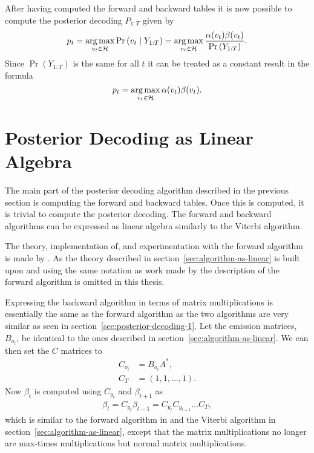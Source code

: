 After having computed the forward and backward tables it is now possible to
compute the posterior decoding $P_{1:T}$ given by
\begin{equation*}
  p_t = \operatorname*{arg\,max}_{v_t \in \mathcal{H}} \Pr \left(v_t \mid Y_{1:T} \right) =
  \operatorname*{arg\,max}_{v_t \in \mathcal{H}} \frac{\alpha(v_t) \beta(v_t)}{\Pr \left( Y_{1:T} \right)}.
\end{equation*}
Since $\Pr ( Y_{1:T} )$ is the same for all $t$ it can be treated as
a constant result in the formula
\begin{equation}
  \label{eq:6}
  p_t = \operatorname*{arg\,max}_{v_t \in \mathcal{H}} \alpha(v_t) \beta(v_t).
\end{equation}

\section{Posterior Decoding as Linear Algebra}

The main part of the posterior decoding algorithm described in the previous
section is computing the forward and backward tables. Once this is computed, it is
trivial to compute the posterior decoding. The forward and backward algorithms can
be expressed as linear algebra similarly to the Viterbi algorithm.

The theory, implementation of, and experimentation with the forward algorithm
is made by \citet{sand2013ziphmmlib}. As the theory described in
section~\ref{sec:algorithm-as-linear} is built upon and using the same notation
as work made by \citet{sand2013ziphmmlib} the description of the forward
algorithm is omitted in this thesis.

Expressing the backward algorithm in terms of matrix multiplications is
essentially the same as the forward algorithm as the two algorithms are very
similar as seen in section~\ref{sec:posterior-decoding-1}. Let the emission
matrices, $B_{o_i}$, be identical to the ones described in
section~\ref{sec:algorithm-as-linear}. We can then set the $C$ matrices to
\begin{equation}
  \label{eq:4}
  \begin{aligned}
    C_{o_i} & = B_{o_i} A^*, \\
    C_T & = (1, 1, \dots, 1).
  \end{aligned}
\end{equation}
Now $\beta_t$ is computed using $C_{y_t}$ and $\beta_{t + 1}$ as
\begin{equation}
  \label{eq:5}
  \begin{aligned}
    \beta_t = C_{y_t} \beta_{t - 1} = C_{y_t} C_{y_{t+1}}\dots C_T,
  \end{aligned}
\end{equation}
which is similar to the forward algorithm in \citet{sand2013ziphmmlib} and the
Viterbi algorithm in section~\ref{sec:algorithm-as-linear}, except that the
matrix multiplications no longer are max-times multiplications but normal
matrix multiplications.

